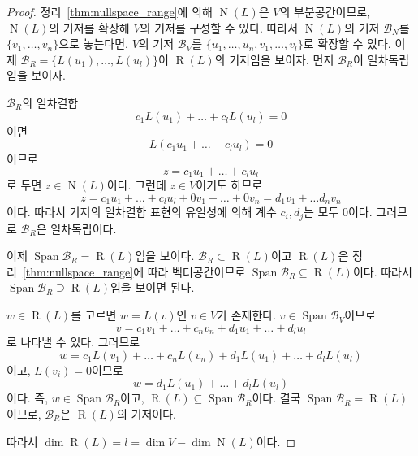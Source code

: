 \documentclass[unfonts,oneside,a4paper]{oblivoir}
\theoremstyle{definition}
\theoremstyle{theorem}
\theoremstyle{theorem}
\theoremstyle{remark}
\theoremstyle{remark}
\theoremstyle{remark}
\theoremstyle{remark}
\renewcommand{\vec}[1]{\bm{\mathit{#1}}}
\newcommand{\vecz}{\bm{\mathrm{0}}}
\DeclareMathOperator{\Span}{Span}
\DeclareMathOperator{\Null}{N}
\DeclareMathOperator{\Range}{R}
\begin{document}
\begin{proof}
    정리~\ref{thm:nullspace_range}에 의해 $\Null(L)$은 $V$의 부분공간이므로, $\Null(L)$의 기저를 확장해 $V$의 기저를 구성할 수 있다.
    따라서 $\Null (L)$의 기저 $\mathcal B_N$를 $\{\vec v_1, \dots, \vec v_n\}$으로 놓는다면, $V$의 기저 $\mathcal B_V$를 $\{\vec u_1, \dots, \vec u_n, \vec v_1, \dots, \vec v_l\}$로 확장할 수 있다.
    이제 $\mathcal B_R = \{L(\vec u_1), \dots, L(\vec u_l)\}$이 $\Range(L)$의 기저임을 보이자.
    먼저 $\mathcal B_R$이 일차독립임을 보이자.

    $\mathcal B_R$의 일차결합
    \begin{equation*}
        c_1 L(\vec u_1) + \dots + c_l L(\vec u_l) = \vecz
    \end{equation*}
    이면
    \begin{equation*}
        L(c_1 \vec u_1 + \dots + c_l \vec u_l) = \vecz
    \end{equation*}
    이므로
    \begin{equation*}
        \vec z = c_1 \vec u_1 + \dots + c_l \vec u_l
    \end{equation*}
    로 두면 $\vec z \in \Null(L)$이다.
    그런데 $\vec z \in V$이기도 하므로
    \begin{equation*}
        \vec z = c_1 \vec u_1 + \dots + c_l \vec u_l + 0 \vec v_1 + \dots + 0 \vec v_n = d_1 \vec v_1 + \dots d_n \vec v_n
    \end{equation*}
    이다.
    따라서 기저의 일차결합 표현의 유일성에 의해 계수 $c_i, d_j$는 모두 0이다.
    그러므로 $\mathcal B_R$은 일차독립이다.

    이제 $\Span \mathcal B_R = \Range(L)$임을 보이다.
    $\mathcal B_R \subset \Range(L)$이고 $\Range(L)$은 정리~\ref{thm:nullspace_range}에 따라 벡터공간이므로 $\Span \mathcal B_R \subseteq \Range(L)$이다.
    따라서 $\Span \mathcal B_R \supseteq \Range(L)$임을 보이면 된다.

    $\vec w \in \Range(L)$를 고르면 $\vec w = L(\vec v)$인 $\vec v \in V$가 존재한다.
    $\vec v \in \Span \mathcal B_V$이므로
    \begin{equation*}
        \vec v = c_1 \vec v_1 + \dots + c_n \vec v_n + d_1 \vec u_1 + \dots + d_l \vec u_l
    \end{equation*}
    로 나타낼 수 있다.
    그러므로
    \begin{equation*}
        \vec w = c_1 L(\vec v_1) + \dots + c_n L(\vec v_n) + d_1 L(\vec u_1) + \dots + d_l L(\vec u_l)
    \end{equation*}
    이고, $L(\vec v_i) = \vecz$이므로
    \begin{equation*}
        \vec w = d_1 L(\vec u_1) + \dots + d_l L(\vec u_l)
    \end{equation*}
    이다.
    즉, $\vec w \in \Span \mathcal B_R$이고, $\Range(L) \subseteq \Span \mathcal B_R$이다.
    결국 $\Span \mathcal B_R = \Range(L)$이므로, $\mathcal B_R$은 $\Range(L)$의 기저이다.

    따라서 $\dim \Range(L) = l = \dim V - \dim \Null(L)$이다.
\end{proof}
\end{document}
